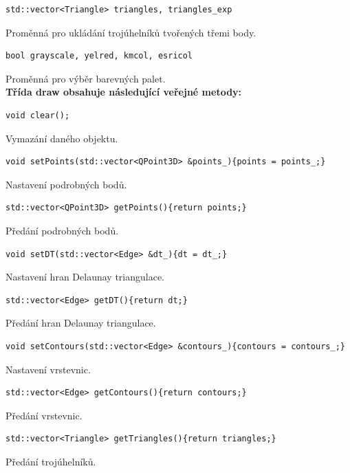 \documentclass[a4paper, 12pt, oneside, titlepage]{article} %
\begin{document}
\begin{verbatim}
std::vector<Triangle> triangles, triangles_exp
\end{verbatim}
Proměnná pro ukládání trojúhelníků tvořených třemi body.\\

\begin{verbatim}
bool grayscale, yelred, kmcol, esricol
\end{verbatim}
Proměnná pro výběr barevných palet.\\

\textbf{Třída draw obsahuje následující veřejné metody:}
\begin{verbatim}
void clear();
\end{verbatim}
Vymazání daného objektu.\\

\begin{verbatim}
void setPoints(std::vector<QPoint3D> &points_){points = points_;}
\end{verbatim}
Nastavení podrobných bodů.\\

\begin{verbatim}
std::vector<QPoint3D> getPoints(){return points;}
\end{verbatim}
Předání podrobných bodů.\\

\begin{verbatim}
void setDT(std::vector<Edge> &dt_){dt = dt_;}
\end{verbatim}
Nastavení hran Delaunay triangulace.\\

\begin{verbatim}
std::vector<Edge> getDT(){return dt;}
\end{verbatim}
Předání hran Delaunay triangulace.\\

\begin{verbatim}
void setContours(std::vector<Edge> &contours_){contours = contours_;}
\end{verbatim}
Nastavení vrstevnic.\\

\begin{verbatim}
std::vector<Edge> getContours(){return contours;}
\end{verbatim}
Předání vrstevnic.\\

\begin{verbatim}
std::vector<Triangle> getTriangles(){return triangles;}
\end{verbatim}
Předání trojúhelníků.\\
\end{document}
